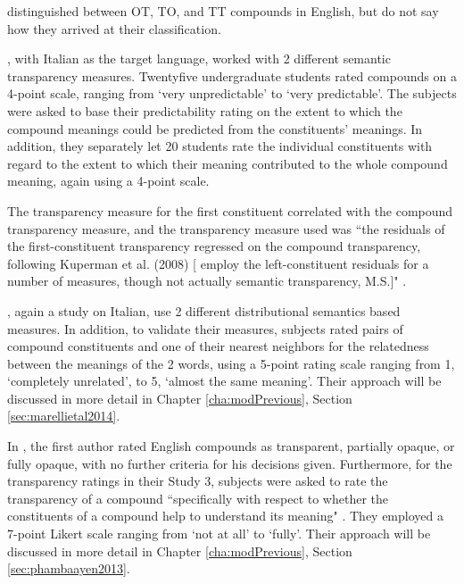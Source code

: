 \citet{El-Bialy_etal:2013} distinguished between OT, TO, and TT
compounds in English, but do not say how
they arrived at their classification.


\citet{MarelliandLuzzatti:2012}, with Italian as the target language, worked with 2 different semantic transparency
measures. Twentyfive undergraduate students rated compounds on a 4-point
scale, ranging from `very unpredictable' to `very predictable'. The
subjects were asked to base their predictability rating on the extent to which
the compound meanings could be predicted from the constituents' meanings. In
addition, they separately let 20 students rate the individual constituents
with regard to the extent to which their meaning contributed to the whole
compound meaning, again using a 4-point scale. 

The transparency measure for the first constituent correlated with the
compound transparency measure, and the transparency measure used was
``the residuals of the first-constituent transparency regressed on the
compound trans\-par\-en\-cy, following Kuperman et al. (2008)
[\citet{Kupermanetal:2008} employ the left-constituent residuals for a number
of measures, though not actually semantic transparency, M.S.]" \citep[648]{MarelliandLuzzatti:2012}. 

\citet{Marellietal:2014}, again a study on Italian, use 2 different
distributional semantics based measures. In addition, to validate
their measures, subjects rated pairs of compound constituents and one
of their nearest neighbors for the relatedness
 between the meanings of the 2 words, using a 5-point rating scale
 ranging from 1, `completely unrelated', to 5, `almost the same meaning'. Their
 approach will be discussed in more detail in Chapter
 \ref{cha:modPrevious}, Section \ref{sec:marellietal2014}.


In \citet{PhamandBaayen:2013}, the first author rated English compounds as
transparent, partially opaque, or fully opaque, with no further criteria
for his decisions given. Furthermore, for the transparency ratings in their Study 3,
subjects were asked to rate the transparency of a compound
``specifically with respect to whether the constituents of a compound
help to understand its meaning" \citep[467]{PhamandBaayen:2013}. They
employed a 7-point Likert scale ranging from `not at all' to `fully'. 
Their
 approach will be discussed in more detail in Chapter \ref{cha:modPrevious},
 Section \ref{sec:phambaayen2013}.


